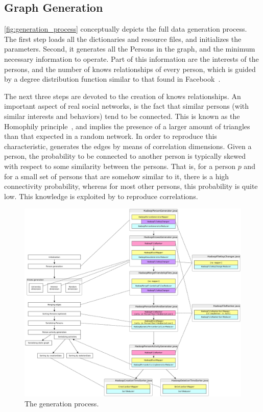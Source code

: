 \subsection{Graph Generation}

\autoref{fig:generation_process} conceptually depicts the full data
generation process. The first step loads all the dictionaries and resource
files, and initializes the \datagen parameters.  Second, it generates all the
Persons in the graph, and the minimum necessary information to operate. Part of
this information are the interests of the persons, and the number of knows
relationships of every person, which is guided by a degree distribution
function similar to that found in Facebook~\cite{facebook_anatomy}.

The next three steps are devoted to the creation of knows relationships.  An
important aspect of real social networks, is the fact that similar persons
(with similar interests and behaviors) tend to be connected. This is known as
the Homophily principle~\cite{mcpherson2001birds,DBLP:journals/socnet/BaroneC18}, and implies the presence of
a larger amount of triangles than that expected in a random network. In order
to reproduce this characteristic, \datagen generates the edges by means of
correlation dimensions.  Given a person, the probability to be connected to
another person is typically skewed with respect to some similarity between the
persons. That is, for a person $p$ and for a small set of persons that are
somehow similar to it, there is a high connectivity probability, whereas for
most other persons, this probability is quite low. This knowledge is
exploited by \datagen to reproduce correlations.

\begin{figure}[H]
    \centering
    \includegraphics[scale=\yedscale]{figures/datagen-workflow}
    \caption{The \datagen generation process.}
    \label{fig:generation_process}
\end{figure}

